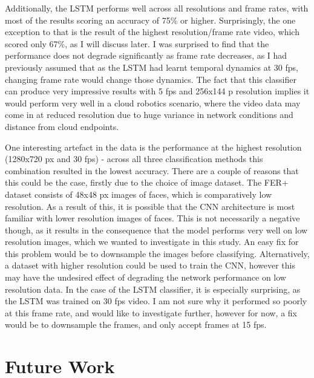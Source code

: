 \documentclass[sigconf]{acmart}
\begin{document}
{Additionally, the LSTM performs well across all resolutions and frame rates,
with most of the results scoring an accuracy of 75\% or higher. Surprisingly,
the one exception to that is the result of the highest resolution/frame rate
video, which
scored only 67\%, as I will discuss later. 
I was surprised to find that the performance does not degrade significantly as frame rate
decreases, as I had previously assumed that as the LSTM had learnt temporal
dynamics at 30 fps, changing frame rate would change those dynamics.
The fact that this classifier can
produce very impressive results with 5 fps and 256x144 p resolution implies it
would perform very well in a cloud robotics scenario, where the video data may
come in at reduced resolution due to huge variance in network conditions and
distance from cloud endpoints.

One interesting artefact in the data is the performance at the highest
resolution (1280x720 px and 30 fps) - across all three classification methods
this combination resulted in the lowest accuracy.
There are a couple of
reasons that this could be the case, firstly due to the choice of image
dataset. The FER+ dataset consists of 48x48 px images of faces, which is
comparatively low resolution. As a result of this, it is possible that
the CNN architecture is most familiar with lower resolution images of faces.
This is not necessarily a negative though, as it results in the consequence
that the model performs very well on low resolution images, which we wanted to
investigate
in this study. 
An easy fix for this problem would be to downsample the images before
classifying. Alternatively, a dataset with higher resolution could be used to train the
CNN, however this may have the undesired effect of degrading the network
performance on low resolution data.
In the case of the LSTM classifier, it is especially surprising, as the LSTM
was trained on 30 fps video. I am not sure why it performed so poorly at this
frame rate, and would like to investigate further, however for now, a fix
would be to downsample the frames, and only accept frames at 15 fps.


\section{Future Work}

}
\end{document}
